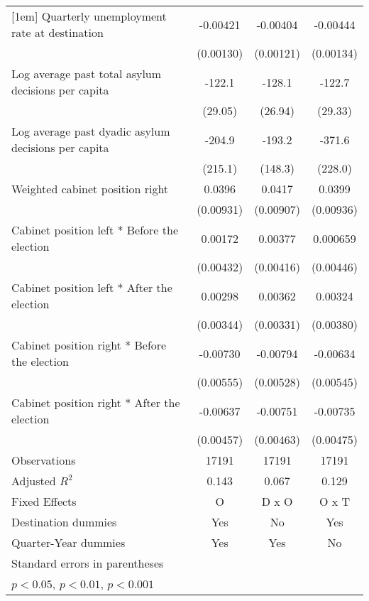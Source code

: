 \begin{table}[htbp]
\begin{tabular}{l*{3}{c}}
[1em]
Quarterly unemployment rate at destination&    -0.00421\sym{**} &    -0.00404\sym{**} &    -0.00444\sym{**} \\
                    &   (0.00130)         &   (0.00121)         &   (0.00134)         \\
[1em]
Log average past total asylum decisions per capita&      -122.1\sym{***}&      -128.1\sym{***}&      -122.7\sym{***}\\
                    &     (29.05)         &     (26.94)         &     (29.33)         \\
[1em]
Log average past dyadic asylum decisions per capita&      -204.9         &      -193.2         &      -371.6         \\
                    &     (215.1)         &     (148.3)         &     (228.0)         \\
[1em]
Weighted cabinet position right&      0.0396\sym{***}&      0.0417\sym{***}&      0.0399\sym{***}\\
                    &   (0.00931)         &   (0.00907)         &   (0.00936)         \\
[1em]
Cabinet position left * Before the election&     0.00172         &     0.00377         &    0.000659         \\
                    &   (0.00432)         &   (0.00416)         &   (0.00446)         \\
[1em]
Cabinet position left * After the election&     0.00298         &     0.00362         &     0.00324         \\
                    &   (0.00344)         &   (0.00331)         &   (0.00380)         \\
[1em]
Cabinet position right * Before the election&    -0.00730         &    -0.00794         &    -0.00634         \\
                    &   (0.00555)         &   (0.00528)         &   (0.00545)         \\
[1em]
Cabinet position right * After the election&    -0.00637         &    -0.00751         &    -0.00735         \\
                    &   (0.00457)         &   (0.00463)         &   (0.00475)         \\
\hline
Observations        &       17191         &       17191         &       17191         \\
Adjusted \(R^{2}\)  &       0.143         &       0.067         &       0.129         \\
Fixed Effects       &           O         &       D x O         &       O x T         \\
Destination dummies &         Yes         &          No         &         Yes         \\
Quarter-Year dummies&         Yes         &         Yes         &          No         \\
\hline\hline
\multicolumn{4}{l}{\footnotesize Standard errors in parentheses}\\
\multicolumn{4}{l}{\footnotesize \sym{*} \(p<0.05\), \sym{**} \(p<0.01\), \sym{***} \(p<0.001\)}\\
\end{tabular}
\end{table}
